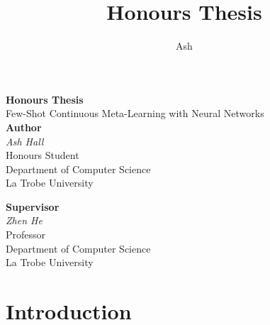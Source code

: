 \documentclass{report}
\title{Honours Thesis}
\author{Ash}
\begin{document}
\begin{titlepage}
 \begin{center}
  \vspace*{5cm}
  {\huge \textbf{Honours Thesis}} \\
  \vspace{0.3cm}
  {\large Few-Shot Continuous Meta-Learning with Neural Networks} \\
  \vspace*{2cm}
  \textbf{Author} \\
  \textit{Ash Hall} \\
  Honours Student \\
  Department of Computer Science \\
  La Trobe University \\
  \vspace{0.75cm}

  \textbf{Supervisor} \\
  \textit{Zhen He} \\
  Professor \\
  Department of Computer Science \\
  La Trobe University \\


  \vfill
 \end{center}
\end{titlepage}
\thispagestyle{empty}
\newpage
\thispagestyle{empty}
\tableofcontents
\newpage
\thispagestyle{empty}
\listoffigures
\newpage

\chapter{Introduction}
\end{document}
